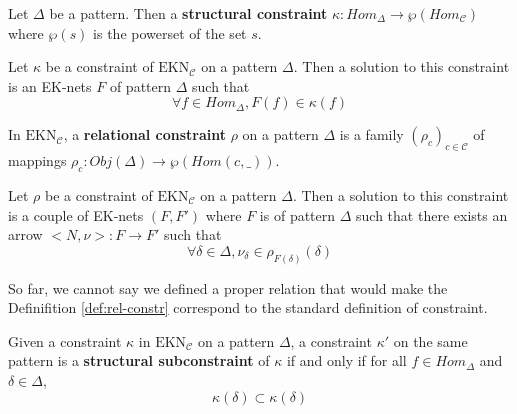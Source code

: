 \begin{defn}
    Let $\Delta$ be a pattern. Then a \textbf{structural constraint} $\kappa :Hom_\Delta \rightarrow \wp(Hom_\mathcal{C})$  where $\wp(s)$ is the powerset of the set $s$\label{nomencl:pow-set}.
\end{defn}

\begin{defn}
    \label{def:struct-constr}
    Let $\kappa$ be a constraint of $\text{EKN}_\mathcal{C}$ on a pattern $\Delta$. Then a solution to this constraint is an EK-nets $F$ of pattern $\Delta$ such that
    $$ \forall f \in Hom_\Delta, F(f)\in \kappa(f)$$
\end{defn}

\begin{defn}
    In $\text{EKN}_\mathcal{C}$, a \textbf{relational constraint} $\rho$ on a pattern $\Delta$ is a family
    $(\rho_c)_{c\in\mathcal{C}}$
    of mappings $\rho_c : Obj(\Delta) \rightarrow \wp(Hom(c,\_))$.
\end{defn}


\begin{defn}
    \label{def:rel-constr}
    Let $\rho$ be a constraint of $\text{EKN}_\mathcal{C}$ on a pattern $\Delta$. Then a solution to this constraint is a couple of EK-nets $(F,F')$ where $F$ is of pattern $\Delta$ such that there exists an arrow $\big<N,\nu\big> : F\rightarrow F'$ such that
    $$\forall \delta \in \Delta, \nu_\delta \in \rho_{F(\delta)}(\delta)$$
\end{defn}

\begin{rem}
    So far, we cannot say we defined a proper relation that would make the Definifition \ref{def:rel-constr} correspond to the standard definition of constraint.
\end{rem}


\begin{defn}
    Given a constraint $\kappa$ in $\text{EKN}_\mathcal{C}$ on a pattern $\Delta$, a constraint $\kappa'$ on the same pattern is a \textbf{structural subconstraint} of $\kappa$ if and only if for all $f\in Hom_\Delta$ and $\delta\in\Delta$,
    $$\kappa(\delta)\subset\kappa(\delta)$$
\end{defn}


